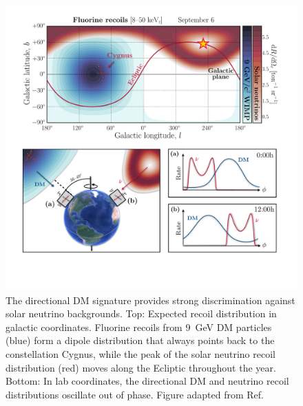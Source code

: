 \begin{figure}[!htbp]
\begin{center}
\includegraphics[width=0.99\columnwidth]{figures/Skymaps_extended.pdf}
\caption{The directional DM signature provides strong discrimination against solar neutrino backgrounds. Top: Expected recoil distribution in galactic coordinates. Fluorine recoils from 9~GeV DM particles (blue) form a dipole distribution that always points back to the constellation Cygnus, while the peak of the solar neutrino recoil distribution (red) moves along the Ecliptic throughout the year. Bottom: In lab coordinates, the directional DM and neutrino recoil distributions oscillate out of phase. Figure adapted from Ref.~\cite{Vahsen:2021gnb}}\label{directional_signature}
\end{center}
\end{figure}
 

